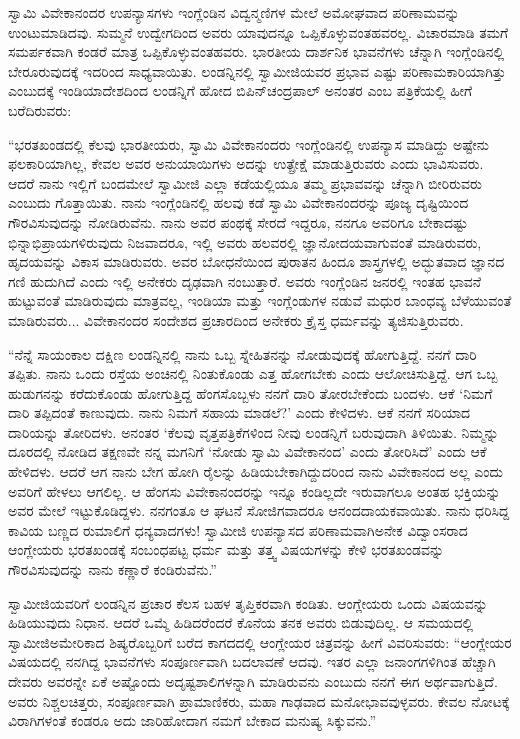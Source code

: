  ಸ್ವಾಮಿ ವಿವೇಕಾನಂದರ ಉಪನ್ಯಾಸಗಳು ಇಂಗ್ಲೆಂಡಿನ ವಿದ್ವನ್ಮಣಿಗಳ ಮೇಲೆ ಅಮೋಘವಾದ ಪರಿಣಾಮವನ್ನು ಉಂಟುಮಾಡಿದವು. ಸುಮ್ಮನೆ ಉದ್ವೇಗದಿಂದ ಅವರು ಯಾವುದನ್ನೂ ಒಪ್ಪಿಕೊಳ್ಳುವಂತಹವರಲ್ಲ. ವಿಚಾರಮಾಡಿ ತಮಗೆ ಸಮರ್ಪಕವಾಗಿ ಕಂಡರೆ ಮಾತ್ರ ಒಪ್ಪಿಕೊಳ್ಳುವಂತಹವರು. ಭಾರತೀಯ ದಾರ್ಶನಿಕ ಭಾವನೆಗಳು ಚೆನ್ನಾಗಿ ಇಂಗ್ಲೆಂಡಿನಲ್ಲಿ ಬೇರೂರುವುದಕ್ಕೆ ಇದರಿಂದ ಸಾಧ್ಯವಾಯಿತು. ಲಂಡನ್ನಿನಲ್ಲಿ ಸ್ವಾಮೀಜಿಯವರ ಪ್ರಭಾವ ಎಷ್ಟು ಪರಿಣಾಮಕಾರಿಯಾಗಿತ್ತು ಎಂಬುದಕ್ಕೆ ಇಂಡಿಯಾದೇಶದಿಂದ ಲಂಡನ್ನಿಗೆ ಹೋದ ಬಿಪಿನ್‌ಚಂದ್ರಪಾಲ್ ಅನಂತರ  ಎಂಬ ಪತ್ರಿಕೆಯಲ್ಲಿ ಹೀಗೆ ಬರೆದಿರುವರು: 

 “ಭರತಖಂಡದಲ್ಲಿ ಕೆಲವು ಭಾರತೀಯರು, ಸ್ವಾಮಿ ವಿವೇಕಾನಂದರು ಇಂಗ್ಲೆಂಡಿನಲ್ಲಿ ಉಪನ್ಯಾಸ ಮಾಡಿದ್ದು ಅಷ್ಟೇನು ಫಲಕಾರಿಯಾಗಿಲ್ಲ, ಕೇವಲ ಅವರ ಅನುಯಾಯಿಗಳು ಅದನ್ನು ಉತ್ಪ್ರೇಕ್ಷೆ ಮಾಡುತ್ತಿರುವರು ಎಂದು ಭಾವಿಸುವರು. ಆದರೆ ನಾನು ಇಲ್ಲಿಗೆ ಬಂದಮೇಲೆ ಸ್ವಾಮೀಜಿ ಎಲ್ಲಾ ಕಡೆಯಲ್ಲಿಯೂ ತಮ್ಮ ಪ್ರಭಾವವನ್ನು ಚೆನ್ನಾಗಿ ಬೀರಿರುವರು ಎಂಬುದು ಗೊತ್ತಾಯಿತು. ನಾನು ಇಂಗ್ಲೆಂಡಿನಲ್ಲಿ ಹಲವು ಕಡೆ ಸ್ವಾಮಿ ವಿವೇಕಾನಂದರನ್ನು ಪೂಜ್ಯ ದೃಷ್ಟಿಯಿಂದ ಗೌರವಿಸುವುದನ್ನು ನೋಡಿರುವೆನು. ನಾನು ಅವರ ಪಂಥಕ್ಕೆ ಸೇರದೆ ಇದ್ದರೂ, ನನಗೂ ಅವರಿಗೂ ಬೇಕಾದಷ್ಟು ಭಿನ್ನಾಭಿಪ್ರಾಯಗಳಿರುವುದು ನಿಜವಾದರೂ, ಇಲ್ಲಿ ಅವರು ಹಲವರಲ್ಲಿ ಜ್ಞಾನೋದಯವಾಗುವಂತೆ ಮಾಡಿರುವರು, ಹೃದಯವನ್ನು ವಿಕಾಸ ಮಾಡಿರುವರು. ಅವರ ಬೋಧನೆಯಿಂದ ಪುರಾತನ ಹಿಂದೂ ಶಾಸ್ತ್ರಗಳಲ್ಲಿ ಅದ್ಭುತವಾದ ಜ್ಞಾನದ ಗಣಿ ಹುದುಗಿದೆ ಎಂದು ಇಲ್ಲಿ ಅನೇಕರು ದೃಢವಾಗಿ ನಂಬುತ್ತಾರೆ. ಅವರು ಇಂಗ್ಲೆಂಡಿನ ಜನರಲ್ಲಿ ಇಂತಹ ಭಾವನೆ ಹುಟ್ಟುವಂತೆ ಮಾಡಿರುವುದು ಮಾತ್ರವಲ್ಲ, ಇಂಡಿಯಾ ಮತ್ತು ಇಂಗ್ಲೆಂಡುಗಳ ನಡುವೆ ಮಧುರ ಬಾಂಧವ್ಯ ಬೆಳೆಯುವಂತೆ ಮಾಡಿರುವರು... ವಿವೇಕಾನಂದರ ಸಂದೇಶದ ಪ್ರಚಾರದಿಂದ ಅನೇಕರು ಕ್ರೈಸ್ತ ಧರ್ಮವನ್ನು ತ್ಯಜಿಸುತ್ತಿರುವರು. 

 “ನೆನ್ನೆ ಸಾಯಂಕಾಲ ದಕ್ಷಿಣ ಲಂಡನ್ನಿನಲ್ಲಿ ನಾನು ಒಬ್ಬ ಸ್ನೇಹಿತನನ್ನು ನೋಡುವುದಕ್ಕೆ ಹೋಗುತ್ತಿದ್ದೆ. ನನಗೆ ದಾರಿ ತಪ್ಪಿತು. ನಾನು ಒಂದು ರಸ್ತೆಯ ಅಂಚಿನಲ್ಲಿ ನಿಂತುಕೊಂಡು ಎತ್ತ ಹೋಗಬೇಕು ಎಂದು ಆಲೋಚಿಸುತ್ತಿದ್ದೆ. ಆಗ ಒಬ್ಬ ಹುಡುಗನನ್ನು ಕರೆದುಕೊಂಡು ಹೋಗುತ್ತಿದ್ದ ಹೆಂಗಸೊಬ್ಬಳು ನನಗೆ ದಾರಿ ತೋರಬೇಕೆಂದು ಬಂದಳು. ಆಕೆ ‘ನಿಮಗೆ ದಾರಿ ತಪ್ಪಿದಂತೆ ಕಾಣುವುದು. ನಾನು ನಿಮಗೆ ಸಹಾಯ ಮಾಡಲೆ?’ ಎಂದು ಕೇಳಿದಳು. ಆಕೆ ನನಗೆ ಸರಿಯಾದ ದಾರಿಯನ್ನು ತೋರಿದಳು. ಅನಂತರ ‘ಕೆಲವು ವೃತ್ತಪತ್ರಿಕೆಗಳಿಂದ ನೀವು ಲಂಡನ್ನಿಗೆ ಬರುವುದಾಗಿ ತಿಳಿಯಿತು. ನಿಮ್ಮನ್ನು ದೂರದಲ್ಲಿ ನೋಡಿದ ತಕ್ಷಣವೇ ನನ್ನ ಮಗನಿಗೆ ‘ನೋಡು ಸ್ವಾಮಿ ವಿವೇಕಾನಂದ’ ಎಂದು ತೋರಿಸಿದೆ’ ಎಂದು ಆಕೆ ಹೇಳಿದಳು. ಆದರೆ ಆಗ ನಾನು ಬೇಗ ಹೋಗಿ ರೈಲನ್ನು ಹಿಡಿಯಬೇಕಾಗಿದ್ದುದರಿಂದ ನಾನು ವಿವೇಕಾನಂದ ಅಲ್ಲ ಎಂದು ಅವರಿಗೆ ಹೇಳಲು ಆಗಲಿಲ್ಲ. ಆ ಹೆಂಗಸು ವಿವೇಕಾನಂದರನ್ನು ಇನ್ನೂ ಕಂಡಿಲ್ಲದೇ ಇರುವಾಗಲೂ ಅಂತಹ ಭಕ್ತಿಯನ್ನು ಅವರ ಮೇಲೆ ಇಟ್ಟುಕೊಡಿದ್ದಳು. ನನಗಂತೂ ಆ ಘಟನೆ ಸೋಜಿಗವಾದರೂ ಆನಂದದಾಯಕವಾಯಿತು. ನಾನು ಧರಿಸಿದ್ದ ಕಾವಿಯ ಬಣ್ಣದ ರುಮಾಲಿಗೆ ಧನ್ಯವಾದಗಳು! ಸ್ವಾಮೀಜಿ ಉಪನ್ಯಾಸದ ಪರಿಣಾಮವಾಗಿ\break ಅನೇಕ ವಿದ್ವಾಂಸರಾದ ಆಂಗ್ಲೇಯರು ಭರತಖಂಡಕ್ಕೆ ಸಂಬಂಧಪಟ್ಟ ಧರ್ಮ ಮತ್ತು ತತ್ತ್ವ ವಿಷಯಗಳನ್ನು ಕೇಳಿ ಭರತಖಂಡವನ್ನು ಗೌರವಿಸುವುದನ್ನು ನಾನು ಕಣ್ಣಾರೆ ಕಂಡಿರುವೆನು.” 

 ಸ್ವಾಮೀಜಿಯವರಿಗೆ ಲಂಡನ್ನಿನ ಪ್ರಚಾರ ಕೆಲಸ ಬಹಳ ತೃಪ್ತಿಕರವಾಗಿ ಕಂಡಿತು. ಆಂಗ್ಲೇಯರು ಒಂದು ವಿಷಯವನ್ನು ಹಿಡಿಯುವುದು ನಿಧಾನ. ಆದರೆ ಒಮ್ಮೆ ಹಿಡಿದರೆಂದರೆ ಕೊನೆಯ ತನಕ ಅವರು ಬಿಡುವುದಿಲ್ಲ. ಆ ಸಮಯದಲ್ಲಿ ಸ್ವಾಮೀಜಿ\break ಅಮೇರಿಕಾದ ಶಿಷ್ಯರೊಬ್ಬರಿಗೆ ಬರೆದ ಕಾಗದದಲ್ಲಿ ಆಂಗ್ಲೇಯರ ಚಿತ್ರವನ್ನು ಹೀಗೆ ವಿವರಿಸುವರು: “ಆಂಗ್ಲೇಯರ ವಿಷಯದಲ್ಲಿ ನನಗಿದ್ದ ಭಾವನೆಗಳು ಸಂಪೂರ್ಣವಾಗಿ ಬದಲಾವಣೆ ಆದವು. ಇತರ ಎಲ್ಲಾ ಜನಾಂಗಗಳಿಗಿಂತ ಹೆಚ್ಚಾಗಿ ದೇವರು ಅವರನ್ನೇ ಏಕೆ ಅಷ್ಟೊಂದು ಅದೃಷ್ಟಶಾಲಿಗಳನ್ನಾಗಿ ಮಾಡಿರುವನು ಎಂಬುದು ನನಗೆ ಈಗ ಅರ್ಥವಾಗುತ್ತಿದೆ. ಅವರು ನಿಶ್ಚಲಚಿತ್ತರು, ಸಂಪೂರ್ಣವಾಗಿ ಪ್ರಾಮಾಣಿಕರು, ಮಹಾ ಗಾಢವಾದ ಮನೋಭಾವವುಳ್ಳವರು. ಕೇವಲ ನೋಟಕ್ಕೆ ವಿರಾಗಿಗಳಂತೆ ಕಂಡರೂ ಅದು ಜಾರಿಹೋದಾಗ ನಮಗೆ ಬೇಕಾದ ಮನುಷ್ಯ ಸಿಕ್ಕುವನು.” 

